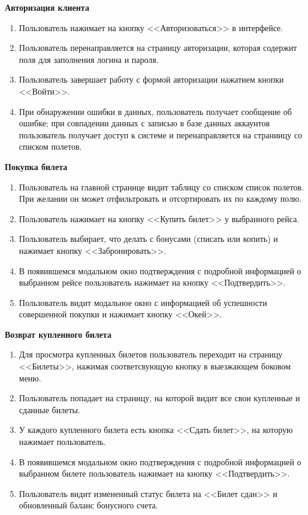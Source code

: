 \textbf{Авторизация клиента}
\begin{enumerate}
	\item Пользователь нажимает на кнопку <<Авторизоваться>> в интерфейсе.
	\item Пользователь перенаправляется на страницу авторизации, которая содержит поля для заполнения логина и пароля.
	\item Пользователь завершает работу с формой авторизации нажатием кнопки <<Войти>>.
	\item При обнаружении ошибки в данных, пользователь получает сообщение об ошибке; при совпадении данных с записью в базе данных аккаунтов пользователь получает доступ к системе и перенаправляется на страниицу со списком полетов.
\end{enumerate}

\textbf{Покупка билета}
\begin{enumerate}
	\item Пользователь на главной странице видит таблицу со списком список полетов. При желании он может отфильтровать и отсортировать их по каждому полю.
	\item Пользователь нажимает на кнопку <<Купить билет>> у выбранного рейса.
  \item Пользователь выбирает, что делать с бонусами (списать или копить) и нажимает кнопку <<Забронировать>>.
  \item В появившемся модальном окно подтверждения с подробной информацией о выбранном рейсе пользователь нажимает на кнопку <<Подтвердить>>.
	\item Пользователь видит модальное окно с информацией об успешности совершенной покупки и нажимает кнопку <<Окей>>.
\end{enumerate}

\textbf{Возврат купленного билета}
\begin{enumerate}
	\item Для просмотра купленных билетов пользователь переходит на страницу <<Билеты>>, нажимая соответсвующую кнопку в выезжающем боковом меню.
	\item Пользователь попадает на страницу, на которой видит все свои купленные и сданные билеты.
	\item У каждого купленного билета есть кнопка <<Сдать билет>>, на которую нажимает пользователь.
	\item В появившемся модальном окно подтверждения с подробной информацией о выбранном билете пользователь нажимает на кнопку <<Подтвердить>>.
  \item Пользователь видит измененный статус билета на <<Билет сдан>> и обновленный баланс бонусного счета.
\end{enumerate}


